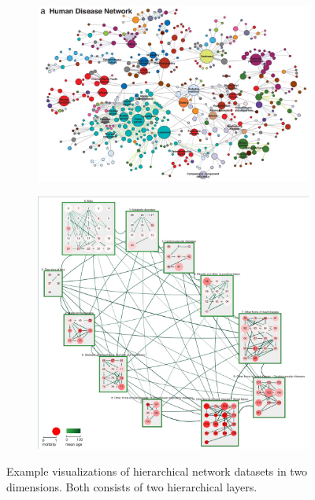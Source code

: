 \begin{figure}[h]
    \centering
    \begin{subfigure}[b]{0.4\columnwidth}
        \centering
        \includegraphics[width=\textwidth, trim={0 0 9cm 0},clip]{graphics/Human_Disease_Network.jpg}
        \label{fig:Human_Disease_Network}
    \end{subfigure}
    \begin{subfigure}[b]{0.5\columnwidth}
      \centering
      \includegraphics[width=\textwidth]{graphics/original2DdiseaseNet.jpg}
      \label{fig:original2DdiseaseNet}
    \end{subfigure}
    \caption[Optional caption for the figure list (often used to abbreviate long captions)]{Example visualizations of hierarchical network datasets in two dimensions. Both consists of two hierarchical layers.} %
    \label{fig:intro} 
  \end{figure}

